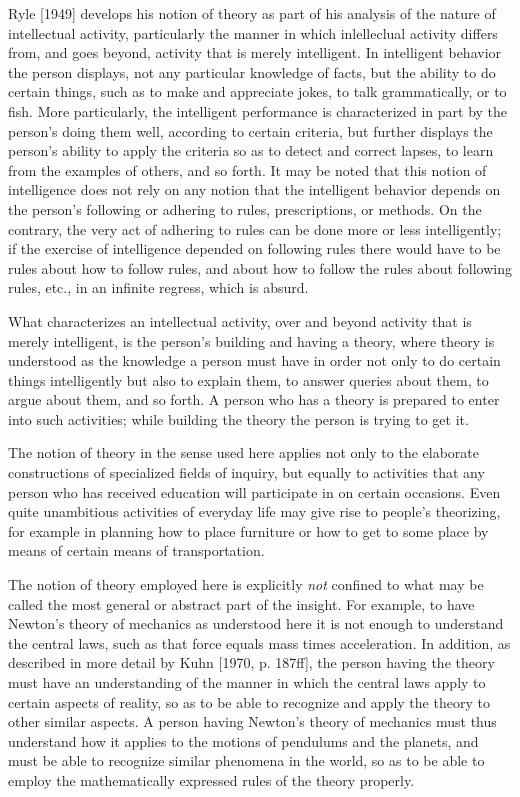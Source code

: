 \documentclass[12pt,letterpaper,twocolumn]{article}
\begin{document}
Ryle [1949] develops his notion of theory as part of his analysis of the nature of intellectual activity, particularly the manner in which inlelleclual activity differs from, and goes beyond, activity that is merely intelligent. In intelligent behavior the person displays, not any particular knowledge of facts, but the ability to do certain things, such as to make and appreciate jokes, to talk grammatically, or to fish. More particularly, the intelligent performance is characterized in part by the person's doing them well, according to certain criteria, but further displays the person's ability to apply the criteria so as to detect and correct lapses, to learn from the examples of others, and so forth. It may be noted that this notion of intelligence does not rely on any notion that the intelligent behavior depends on the person's following or adhering to rules, prescriptions, or methods. On the contrary, the very act of adhering to rules can be done more or less intelligently; if the exercise of intelligence depended on following rules there would have to be rules about how to follow rules, and about how to follow the rules about following rules, etc., in an infinite regress, which is absurd.

What characterizes an intellectual activity, over and beyond activity that is merely intelligent, is the person's building and having a theory, where theory is understood as the knowledge a person must have in order not only to do certain things intelligently but also to explain them, to answer queries about them, to argue about them, and so forth. A person who has a theory is prepared to enter into such activities; while building the theory the person is trying to get it.

The notion of theory in the sense used here applies not only to the elaborate constructions of specialized fields of inquiry, but equally to activities that any person who has received education will participate in on certain occasions. Even quite unambitious activities of everyday life may give rise to people's theorizing, for example in planning how to place furniture or how to get to some place by means of certain means of transportation.

The notion of theory employed here is explicitly \emph{not} confined to what may be called the most general or abstract part of the insight. For example, to have Newton's theory of mechanics as understood here it is not enough to understand the central laws, such as that force equals mass times acceleration. In addition, as described in more detail by Kuhn [1970, p. 187ff], the person having the theory must have an understanding of the manner in which the central laws apply to certain aspects of reality, so as to be able to recognize and apply the theory to other similar aspects. A person having Newton's theory of mechanics must thus understand how it applies to the motions of pendulums and the planets, and must be able to recognize similar phenomena in the world, so as to be able to employ the mathematically expressed rules of the theory properly.
\end{document}
